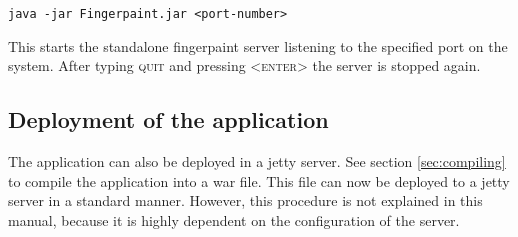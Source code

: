 \begin{verbatim}
java -jar Fingerpaint.jar <port-number>
\end{verbatim}

This starts the standalone fingerpaint server listening to the specified port on the system. After typing \textsc{quit} and pressing \textsc{<enter>} the server is stopped again.

\subsection{Deployment of the application}
\label{sec:deployment}
The application can also be deployed in a jetty server. See section \ref{sec:compiling} to compile the application into a war file. This file can now be deployed to a jetty server in a standard manner. However, this procedure is not explained in this manual, because it is highly dependent on the configuration of the server.